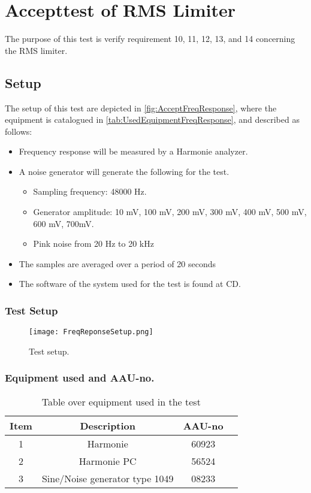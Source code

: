\chapter{Accepttest of RMS Limiter}\label{app:journal_Frequency_Response2}
The purpose of this test is verify requirement 10, 11, 12, 13, and 14 concerning the RMS limiter.

\section{Setup}
The setup of this test are depicted in \autoref{fig:AcceptFreqResponse}, where the equipment is catalogued in \autoref{tab:UsedEquipmentFreqResponse}, and described as follows:

\begin{itemize}
	\item Frequency response will be measured by a Harmonie analyzer.
	\item A noise generator will generate the following for the test. 
	\begin{itemize}
		\item Sampling frequency: 48000 Hz.
		\item Generator amplitude: 10 mV, 100 mV, 200 mV, 300 mV, 400 mV, 500 mV, 600 mV, 700mV.
		\item Pink noise from 20 Hz to 20 kHz
	\end{itemize}
	\item The samples are averaged over a period of 20 seconds
	\item The software of the system used for the test is found at CD. 
\end{itemize}


\subsection*{Test Setup}
\begin{figure}[H]
\centering
\texttt{[image: FreqReponseSetup.png]}
\label{fig:AcceptFreqResponse}
\caption{Test setup.}
\end{figure}

\subsection*{Equipment used and AAU-no.}

\begin{table}[H]
\centering
{}
\begin{tabular}{S[table-format=1]ccc} \toprule
    {Item} & {Description} & {AAU-no} \\       &  Harmonie  & 60923  \\ 
    2      &  Harmonie PC  & 56524  \\ 
    3      &  Sine/Noise generator type 1049  & 08233  \\  \bottomrule 
\end{tabular}
\caption{Table over equipment used in the test}
\label{tab:UsedEquipmentFreqResponse}
\end{table}
\vspace{-5mm}


